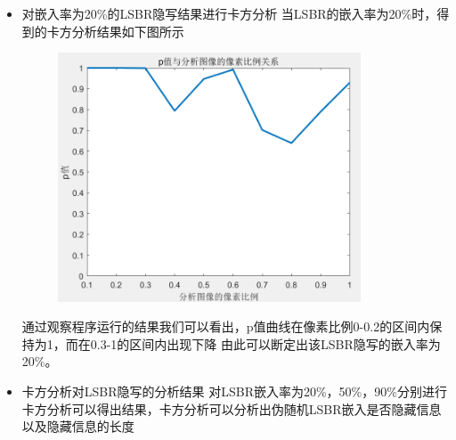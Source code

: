 \documentclass[a4paper,11pt,UTF8]{ctexart}
\newcommand{\bottomcaption}{%
\setlength{\abovecaptionskip}{6pt}%
\setlength{\belowcaptionskip}{6pt}%
\caption}
\newcommand{\xiaowuhao}{\fontsize{9pt}{\baselineskip}\selectfont}   %
\begin{document}
\begin{itemize}
        \item 对嵌入率为20\%的LSBR隐写结果进行卡方分析
          当LSBR的嵌入率为20\%时，得到的卡方分析结果如下图所示
          \begin{figure}[H]
            \centering
            \includegraphics[width=9cm]{k2_LSBR_20.png}
            \bottomcaption{\xiaowuhao{对嵌入率为20\%的LSBR隐写图像卡方分析结果}}
          \end{figure}
          通过观察程序运行的结果我们可以看出，p值曲线在像素比例0-0.2的区间内保持为1，而在0.3-1的区间内出现下降
          由此可以断定出该LSBR隐写的嵌入率为20\%。

        \item 卡方分析对LSBR隐写的分析结果
          对LSBR嵌入率为20\%，50\%，90\%分别进行卡方分析可以得出结果，卡方分析可以分析出伪随机LSBR嵌入是否隐藏信息以及隐藏信息的长度
      \end{itemize}
\end{document}
